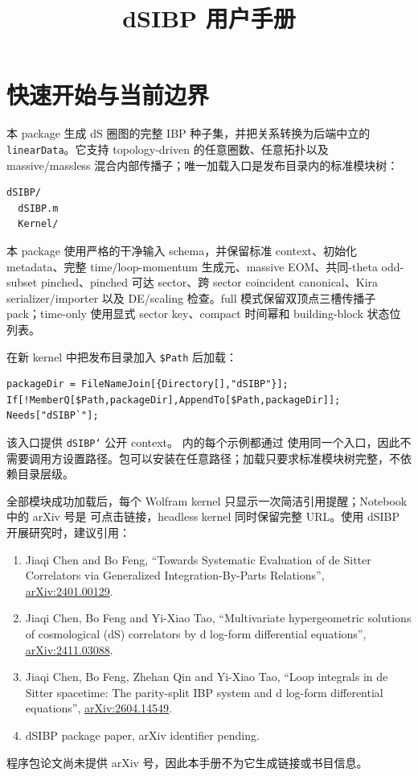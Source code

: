 ﻿\documentclass[a4paper,11pt]{article}
\title{dSIBP 用户手册}
\begin{document}
\sloppy
\setcounter{tocdepth}{1}
\maketitle
\newpage

\section{快速开始与当前边界}

本 package 生成 dS 圈图的完整 IBP 种子集，并把关系转换为后端中立的 \texttt{linearData}。它支持 topology-driven 的任意圈数、任意拓扑以及 massive/massless 混合内部传播子；唯一加载入口是发布目录内的标准模块树：
\begin{verbatim}
dSIBP/
  dSIBP.m
  Kernel/
\end{verbatim}
本 package 使用严格的干净输入 schema，并保留标准 context、初始化 metadata、完整 time/loop-momentum 生成元、massive EOM、共同-theta odd-subset pinched、pinched 可达 sector、跨 sector coincident canonical、Kira serializer/importer 以及 DE/scaling 检查。full 模式保留双顶点三槽传播子 pack；time-only 使用显式 sector key、compact 时间幂和 building-block 状态位列表。

在新 kernel 中把发布目录加入 \texttt{\$Path} 后加载：
\begin{verbatim}
packageDir = FileNameJoin[{Directory[],"dSIBP"}];
If[!MemberQ[$Path,packageDir],AppendTo[$Path,packageDir]];
Needs["dSIBP`"];
\end{verbatim}
该入口提供 \texttt{dSIBP`} 公开 context。 内的每个示例都通过
 使用同一个入口，因此不需要调用方设置路径。包可以安装在任意路径；加载只要求标准模块树完整，不依赖目录层级。

全部模块成功加载后，每个 Wolfram kernel 只显示一次简洁引用提醒；Notebook 中的 arXiv 号是
可点击链接，headless kernel 同时保留完整 URL。使用 dSIBP 开展研究时，建议引用：
\begin{enumerate}
  \item Jiaqi Chen and Bo Feng, ``Towards Systematic Evaluation of de Sitter Correlators via Generalized Integration-By-Parts Relations'', \href{https://arxiv.org/abs/2401.00129}{arXiv:2401.00129}.
  \item Jiaqi Chen, Bo Feng and Yi-Xiao Tao, ``Multivariate hypergeometric solutions of cosmological (dS) correlators by d log-form differential equations'', \href{https://arxiv.org/abs/2411.03088}{arXiv:2411.03088}.
  \item Jiaqi Chen, Bo Feng, Zhehan Qin and Yi-Xiao Tao, ``Loop integrals in de Sitter spacetime: The parity-split IBP system and d log-form differential equations'', \href{https://arxiv.org/abs/2604.14549}{arXiv:2604.14549}.
  \item dSIBP package paper, arXiv identifier pending.
\end{enumerate}
程序包论文尚未提供 arXiv 号，因此本手册不为它生成链接或书目信息。
\end{document}
